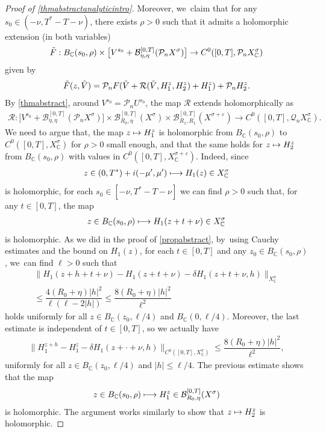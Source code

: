 \documentclass[11pt]{article}
\newcommand\mto{\mathchoice{\longmapsto}{\mapsto}{\mapsto}{\mapsto}}
\theoremstyle{definition}
\let\mc\mathcal
\let\veps\varepsilon
\newcommand{\B}{\mc{B}}
\newcommand{\Q}{\mathcal{Q}}
\renewcommand{\P}{\mathcal{P}}
\providecommand{\norm}[1]{\lVert#1\rVert}
\begin{document}
\begin{proof}[Proof of \cref{thmabstractanalyticintro}]
Moreover, we~claim that for any $s_0\in (-\nu,T^*-T-\nu)$, there exists $\rho>0$ such that it admits a holomorphic extension (in both variables)
\begin{align*}
\Tilde{F}: B_{\mathbb{C}}(s_0, \rho)\times \bigl[V^{s_0}+\B_{\eta,\eta}^{[0,T]}(\P_n X^{\sigma})\bigr]\to C^0([0, T], \P_n X_\mathbb{C}^\sigma)
\end{align*}
given by
\begin{align*}
\Tilde{F}(z,\Tilde{V})=\P_n F(\Tilde{V}+\mathcal{R}(\Tilde{V},H_{1}^z,H_{2}^z)+H_{1}^z)+\P_n H_{2}^z.
\end{align*}
By \cref{thmabstract}, around $V^{s_0}=\P_n U^{s_0}$, the map $\mc{R}$ extends holomorphically as
\begin{align*}
\mathcal{R}: \bigl[ V^{s_0}+ \B_{\eta,\eta}^{[0,T]}(\P_n X^{\sigma})\bigr] \times \B_{R_{0},\eta}^{[0,T]}(X^{\sigma}) \times \B_{R_{1},R_{1}}^{[0,T]}(X^{\sigma+\veps}) \to C^0([0, T], \Q_{n }X_\mathbb{C}^{\sigma}).
\end{align*}
We need to argue that, the map $z\mto H_1^z$ is holomorphic from $B_{\mathbb{C}}(s_0, \rho)$ to $C^0([0, T], X_\mathbb{C}^\sigma)$ for $\rho>0$ small enough, and that the same holds for $z\mto H_2^z$ from $B_{\mathbb{C}}(s_0, \rho)$ with values in $C^0([0, T], X_\mathbb{C}^{\sigma+\veps})$. Indeed, since
\begin{align*}
z\in (0, T^*)+i(-\mu', \mu')\mto H_1(z)\in X_\mathbb{C}^\sigma
\end{align*}
is holomorphic, for each $s_0\in [-\nu, T^*-T-\nu]$ we can find $\rho>0$ such that, for any $t\in [0, T]$, the map
\begin{align*}
z\in B_\mathbb{C}(s_0, \rho)\mto H_1(z+t+\nu)\in X_\mathbb{C}^\sigma
\end{align*}
is holomorphic. As we did in the proof of \cref{propabstract}, by~using Cauchy estimates and the bound on $H_1(z)$, for each $t\in [0, T]$ and any $z_0\in B_\mathbb{C}(s_0, \rho)$, we~can find $\ell>0$ such that
\begin{multline*}
\norm{H_1(z+h+t+\nu)-H_1(z+t+\nu)-\delta H_1(z+t+\nu, h)}_{X_\mathbb{C}^\sigma}\\
\leq \dfrac{4(R_0+\eta)|h|^2}{\ell(\ell-2|h|)}\leq \dfrac{8(R_0+\eta)|h|^2}{\ell^2}
\end{multline*}
holds uniformly for all $z\in B_\mathbb{C}(z_0, \ell/4)$ and $B_\mathbb{C}(0, \ell/4)$. Moreover, the last estimate is independent of $t\in [0, T]$, so we actually have
\begin{align*}
\norm{H_1^{z+h}-H_1^z-\delta H_1(z+\cdot+\nu, h)}_{C^0([0, T], X_\mathbb{C}^\sigma)}\leq \dfrac{8(R_0+\eta)|h|^2}{\ell^2},
\end{align*}
uniformly for all $z\in B_\mathbb{C}(z_0, \ell/4)$ and $|h|\leq \ell/4$. The previous estimate shows that the map
\begin{align*}
z\in B_\mathbb{C}(s_0, \rho)\mto H_1^z\in \B_{R_0, \eta}^{[0, T]}(X^\sigma)
\end{align*}
is holomorphic. The argument works similarly to show that $z\mto H_2^z$ is holomorphic.


\end{proof}
\end{document}
